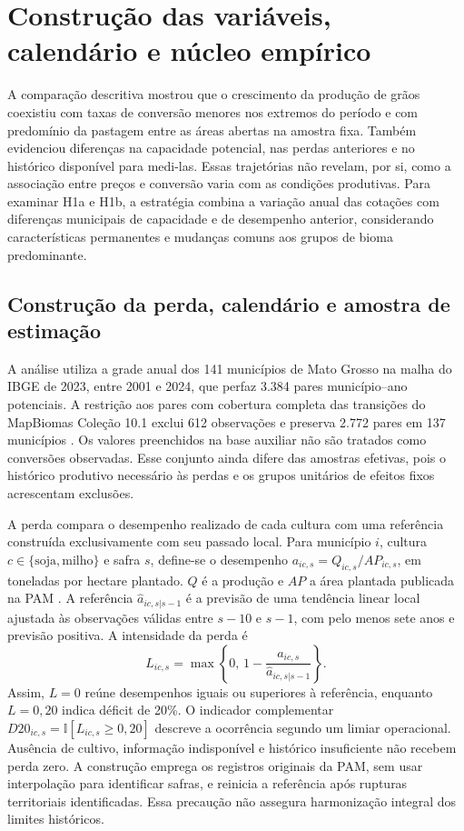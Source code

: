\endgroup


\section{Construção das variáveis, calendário e núcleo empírico}
\label{text:s3}
\label{sec:estrategia}

A comparação descritiva mostrou que o crescimento da produção de grãos coexistiu com taxas de conversão menores nos extremos do período e com predomínio da pastagem entre as áreas abertas na amostra fixa. Também evidenciou diferenças na capacidade potencial, nas perdas anteriores e no histórico disponível para medi-las. Essas trajetórias não revelam, por si, como a associação entre preços e conversão varia com as condições produtivas. Para examinar H1a e H1b, a estratégia combina a variação anual das cotações com diferenças municipais de capacidade e de desempenho anterior, considerando características permanentes e mudanças comuns aos grupos de bioma predominante.

\subsection{Construção da perda, calendário e amostra de estimação}
\label{estrategia-amostra}

A análise utiliza a grade anual dos 141 municípios de Mato Grosso na malha do IBGE de 2023, entre 2001 e 2024, que perfaz 3.384 pares município--ano potenciais. A restrição aos pares com cobertura completa das transições do MapBiomas Coleção 10.1 exclui 612 observações e preserva 2.772 pares em 137 municípios \cite{MapBiomas2026}. Os valores preenchidos na base auxiliar não são tratados como conversões observadas. Esse conjunto ainda difere das amostras efetivas, pois o histórico produtivo necessário às perdas e os grupos unitários de efeitos fixos acrescentam exclusões.

A perda compara o desempenho realizado de cada cultura com uma referência construída exclusivamente com seu passado local. Para município $i$, cultura $c\in\{\mathrm{soja},\mathrm{milho}\}$ e safra $s$, define-se o desempenho $a_{ic,s}=Q_{ic,s}/AP_{ic,s}$, em toneladas por hectare plantado. $Q$ é a produção e $AP$ a área plantada publicada na PAM \cite{IBGEPAM2026}. A referência $\widehat a_{ic,s|s-1}$ é a previsão de uma tendência linear local ajustada às observações válidas entre $s-10$ e $s-1$, com pelo menos sete anos e previsão positiva. A intensidade da perda é
\begin{equation}
L_{ic,s}=\max\left\{0,\,1-\frac{a_{ic,s}}{\widehat a_{ic,s|s-1}}\right\}.
\label{eq:perda-produtiva}
\end{equation}
Assim, $L=0$ reúne desempenhos iguais ou superiores à referência, enquanto $L=0{,}20$ indica déficit de 20\%. O indicador complementar $D20_{ic,s}=\mathbb{I}[L_{ic,s}\geq0{,}20]$ descreve a ocorrência segundo um limiar operacional. Ausência de cultivo, informação indisponível e histórico insuficiente não recebem perda zero. A construção emprega os registros originais da PAM, sem usar interpolação para identificar safras, e reinicia a referência após rupturas territoriais identificadas. Essa precaução não assegura harmonização integral dos limites históricos.

